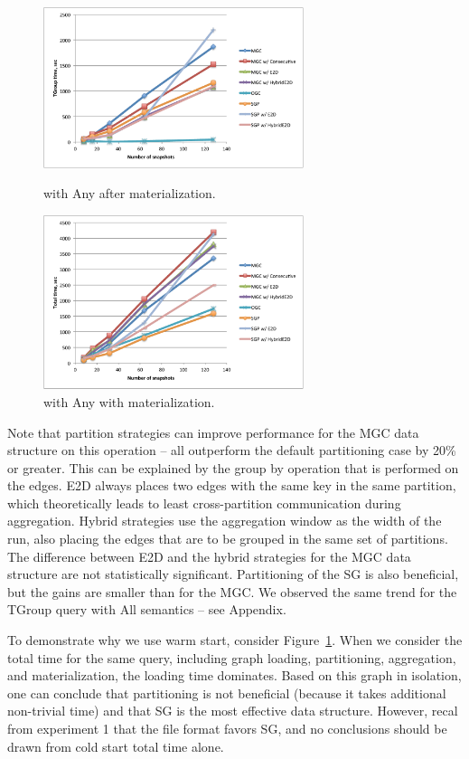 \begin{figure}[t!]
\centering
\begin{minipage}{3.3in}
  \centering
  \includegraphics[width=3in]{figs/tgroupe_warm.pdf}
  \caption{ with Any after materialization.}
  \label{fig:tgroupe}
\end{minipage}
\begin{minipage}{3.3in}
  \centering
  \includegraphics[width=3in]{figs/tgroupe_cold.pdf}
  \caption{ with Any with materialization.}
\label{fig:tgroupe_cold}
\end{minipage}
\end{figure}

Note that partition strategies can improve performance for the MGC
data structure on this operation -- all outperform the default
partitioning case by 20\% or greater.  This can be explained by the
group by operation that is performed on the edges.  E2D always places
two edges with the same key in the same partition, which theoretically
leads to least cross-partition communication during aggregation.
Hybrid strategies use the aggregation window as the width of the run,
also placing the edges that are to be grouped in the same set of
partitions.  The difference between E2D and the hybrid strategies for
the MGC data structure are not statistically significant.
Partitioning of the SG is also beneficial, but the gains are smaller
than for the MGC.  We observed the same trend for the TGroup query
with All semantics -- see Appendix.

To demonstrate why we use warm start, consider
Figure~\ref{fig:tgroupe_cold}.  When we consider the total time for
the same query, including graph loading, partitioning, aggregation,
and materialization, the loading time dominates.  Based on this graph
in isolation, one can conclude that partitioning is not beneficial
(because it takes additional non-trivial time) and that SG is the most
effective data structure.  However, recal from experiment 1 that the
file format favors SG, and no conclusions should be drawn from cold
start total time alone.

